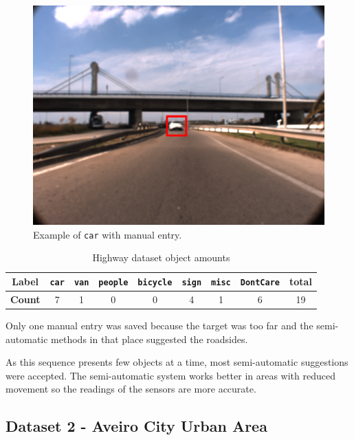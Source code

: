 \begin{figure}[htp]
	
	\centering
	
	\includegraphics[width=.8\textwidth]{capresults/imgs/manual1.png}
	
	\caption{Example of \texttt{car} with manual entry.}
	\label{fig:dataset1results2}
	
\end{figure}

\begin{table}[htp]
	\centering
	\caption{Highway dataset object amounts}
	\label{tab: highwaystats}
	\begin{tabular}{c|c|c|c|c|c|c|c|c}
		\textbf{Label} & \texttt{car} & \texttt{van} & \texttt{people} & \texttt{bicycle} & \texttt{sign} & \texttt{misc} & \texttt{DontCare} & \textbf{total} \\ \hline
		\textbf{Count} & 7            & 1            & 0               & 0                & 4             & 1             & 6                 & 19            
		 
	\end{tabular}
\end{table}

Only one manual entry was saved because the target was too far and the semi-automatic methods in that place suggested the roadsides.

As this sequence presents few objects at a time, most semi-automatic suggestions were accepted. The semi-automatic system works better in areas with reduced movement so the readings of the sensors are more accurate.

\subsection{Dataset 2 - Aveiro City Urban Area}

